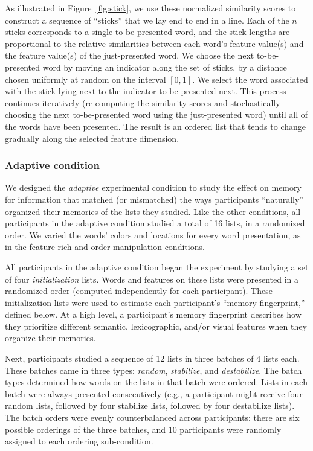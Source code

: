 \documentclass[11pt]{article}
\begin{document}
As illustrated in Figure~\ref{fig:stick}, we use these normalized similarity
scores to construct a sequence of ``sticks'' that we lay end to end in a line.
Each of the $n$ sticks corresponds to a single to-be-presented word, and the
stick lengths are proportional to the relative similarities between each word's
feature value(s) and the feature value(s) of the just-presented word. We choose
the next to-be-presented word by moving an indicator along the set of sticks,
by a distance chosen uniformly at random on the interval $\left[0, 1\right]$.
We select the word associated with the stick lying next to the indicator to be
presented next. This process continues iteratively (re-computing the similarity
scores and stochastically choosing the next to-be-presented word using the
just-presented word) until all of the words have been presented. The result is
an ordered list that tends to change gradually along the selected feature
dimension.

\subsubsection*{Adaptive condition}

We designed the \textit{adaptive} experimental condition to study the effect on
memory for information that matched (or mismatched) the ways participants
``naturally'' organized their memories of the lists they studied. Like the
other conditions, all participants in the adaptive condition studied a total of
16 lists, in a randomized order. We varied the words' colors and locations for
every word presentation, as in the feature rich and order manipulation
conditions.

All participants in the adaptive condition began the experiment by studying a
set of four \textit{initialization} lists. Words and features on these lists
were presented in a randomized order (computed independently for each
participant). These initialization lists were used to estimate each
participant's ``memory fingerprint,'' defined below. At a high level, a
participant's memory fingerprint describes how they prioritize different
semantic, lexicographic, and/or visual features when they organize their
memories.

Next, participants studied a sequence of 12 lists in three batches of 4 lists
each. These batches came in three types: \textit{random}, \textit{stabilize},
and \textit{destabilize}. The batch types determined how words on the lists in
that batch were ordered. Lists in each batch were always presented
consecutively (e.g., a participant might receive four random lists, followed by
four stabilize lists, followed by four destabilize lists). The batch orders
were evenly counterbalanced across participants: there are six possible
orderings of the three batches, and 10 participants were randomly assigned to
each ordering sub-condition.
\end{document}
